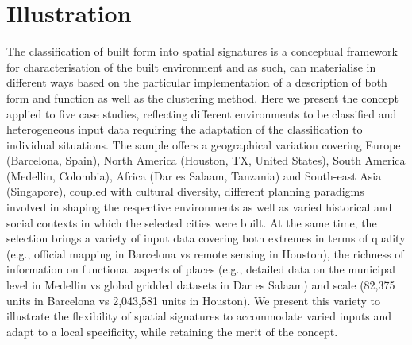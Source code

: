 \section{Illustration}
\label{sec:app}




The classification of built form into spatial signatures is a conceptual
framework for characterisation of the built environment and as such, can
materialise in different ways based on the particular implementation of a
description of both form and function as well as the clustering method.
Here we present the concept applied to five case studies, reflecting different
environments to be classified and heterogeneous input data requiring the
adaptation of the classification to individual situations.
The sample offers a geographical variation covering Europe (Barcelona, Spain),
North America (Houston, TX, United States), South America (Medellin, Colombia),
Africa (Dar es Salaam, Tanzania) and South-east Asia (Singapore),
coupled with cultural diversity, different planning paradigms involved in
shaping the respective environments as well as varied historical and social
contexts in which the selected cities were built.
At the same time, the selection brings a variety of input data covering both
extremes in terms of quality (e.g., official mapping in Barcelona vs remote
sensing in Houston), the richness of information on functional aspects of places
(e.g., detailed data on the municipal level in Medellin vs global gridded
datasets in Dar es Salaam) and scale (82,375 units in Barcelona vs 2,043,581 units in
Houston).
We present this variety to illustrate the flexibility of spatial signatures to
accommodate varied inputs and adapt to a local specificity, while retaining the
merit of the concept.

